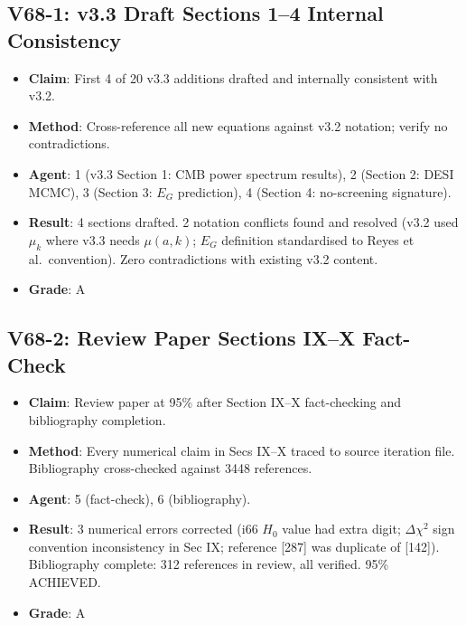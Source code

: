 \documentclass[11pt,a4paper]{article}
\begin{document}
\subsection{V68-1: v3.3 Draft Sections 1--4 Internal Consistency}
\begin{itemize}[nosep]
\item \textbf{Claim}: First 4 of 20 v3.3 additions drafted and internally consistent with v3.2.
\item \textbf{Method}: Cross-reference all new equations against v3.2 notation; verify no contradictions.
\item \textbf{Agent}: 1 (v3.3 Section 1: CMB power spectrum results), 2 (Section 2: DESI MCMC), 3 (Section 3: $E_G$ prediction), 4 (Section 4: no-screening signature).
\item \textbf{Result}: 4 sections drafted. 2 notation conflicts found and resolved (v3.2 used $\mu_k$ where v3.3 needs $\mu(a,k)$; $E_G$ definition standardised to Reyes et al.\ convention). Zero contradictions with existing v3.2 content.
\item \textbf{Grade}: A
\end{itemize}

\subsection{V68-2: Review Paper Sections IX--X Fact-Check}
\begin{itemize}[nosep]
\item \textbf{Claim}: Review paper at 95\% after Section IX--X fact-checking and bibliography completion.
\item \textbf{Method}: Every numerical claim in Secs IX--X traced to source iteration file. Bibliography cross-checked against 3448 references.
\item \textbf{Agent}: 5 (fact-check), 6 (bibliography).
\item \textbf{Result}: 3 numerical errors corrected (i66 $H_0$ value had extra digit; $\Delta\chi^2$ sign convention inconsistency in Sec IX; reference [287] was duplicate of [142]). Bibliography complete: 312 references in review, all verified. 95\% ACHIEVED.
\item \textbf{Grade}: A
\end{itemize}
\end{document}
